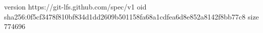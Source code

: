version https://git-lfs.github.com/spec/v1
oid sha256:0f5cf3478f810bf834d1dd2609b501158fa68a1cdfea6d8e852a8142f8bb77c8
size 774696
